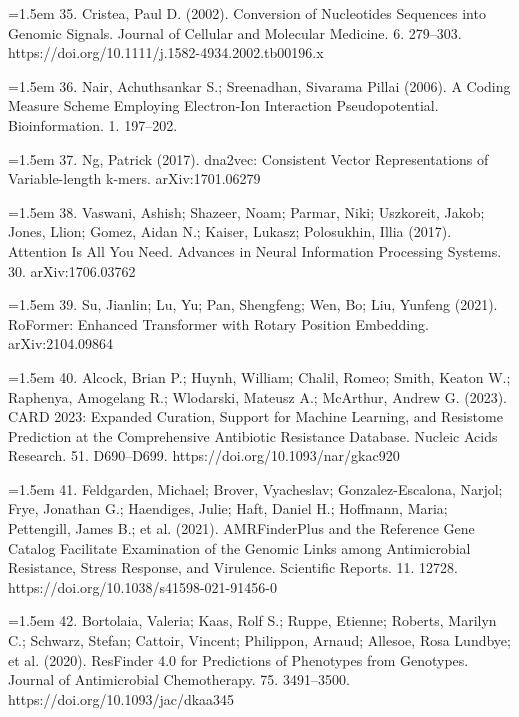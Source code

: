\documentclass[11pt]{article}
\begin{document}
\hangindent=1.5em  35. Cristea, Paul D. (2002). Conversion of Nucleotides Sequences into Genomic Signals. Journal of Cellular and Molecular Medicine. 6. 279--303. https://doi.org/10.1111/j.1582-4934.2002.tb00196.x\par

\hangindent=1.5em  36. Nair, Achuthsankar S.; Sreenadhan, Sivarama Pillai (2006). A Coding Measure Scheme Employing Electron-Ion Interaction Pseudopotential. Bioinformation. 1. 197--202.\par

\hangindent=1.5em  37. Ng, Patrick (2017). dna2vec: Consistent Vector Representations of Variable-length k-mers. arXiv:1701.06279\par

\hangindent=1.5em  38. Vaswani, Ashish; Shazeer, Noam; Parmar, Niki; Uszkoreit, Jakob; Jones, Llion; Gomez, Aidan N.; Kaiser, Lukasz; Polosukhin, Illia (2017). Attention Is All You Need. Advances in Neural Information Processing Systems. 30. arXiv:1706.03762\par

\hangindent=1.5em  39. Su, Jianlin; Lu, Yu; Pan, Shengfeng; Wen, Bo; Liu, Yunfeng (2021). RoFormer: Enhanced Transformer with Rotary Position Embedding. arXiv:2104.09864\par

\hangindent=1.5em  40. Alcock, Brian P.; Huynh, William; Chalil, Romeo; Smith, Keaton W.; Raphenya, Amogelang R.; Wlodarski, Mateusz A.; McArthur, Andrew G. (2023). CARD 2023: Expanded Curation, Support for Machine Learning, and Resistome Prediction at the Comprehensive Antibiotic Resistance Database. Nucleic Acids Research. 51. D690--D699. https://doi.org/10.1093/nar/gkac920\par

\hangindent=1.5em  41. Feldgarden, Michael; Brover, Vyacheslav; Gonzalez-Escalona, Narjol; Frye, Jonathan G.; Haendiges, Julie; Haft, Daniel H.; Hoffmann, Maria; Pettengill, James B.; et al. (2021). AMRFinderPlus and the Reference Gene Catalog Facilitate Examination of the Genomic Links among Antimicrobial Resistance, Stress Response, and Virulence. Scientific Reports. 11. 12728. https://doi.org/10.1038/s41598-021-91456-0\par

\hangindent=1.5em  42. Bortolaia, Valeria; Kaas, Rolf S.; Ruppe, Etienne; Roberts, Marilyn C.; Schwarz, Stefan; Cattoir, Vincent; Philippon, Arnaud; Allesoe, Rosa Lundbye; et al. (2020). ResFinder 4.0 for Predictions of Phenotypes from Genotypes. Journal of Antimicrobial Chemotherapy. 75. 3491--3500. https://doi.org/10.1093/jac/dkaa345\par
\end{document}
